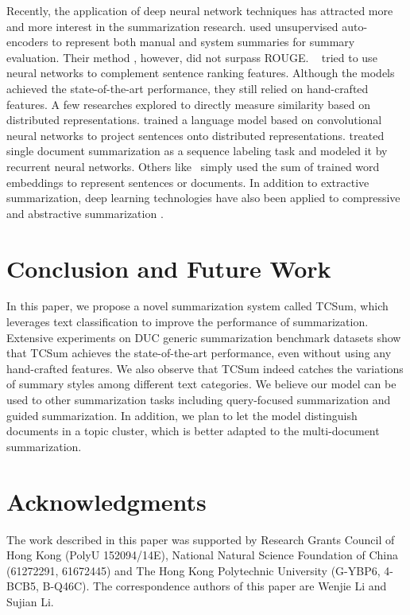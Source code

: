 \documentclass[letterpaper]{article}
\begin{document}
Recently, the application of deep neural network techniques has attracted more and more interest in the summarization research.
\cite{genest2011deep} used unsupervised auto-encoders to represent both manual and system summaries for summary evaluation.
Their method , however, did not surpass ROUGE.
~\cite{cao2015ranking,cao2015learning} tried to use neural networks to complement sentence ranking features.
Although the models achieved the state-of-the-art performance, they still relied on hand-crafted features.
A few researches explored to directly measure similarity based on distributed representations.
\cite{yin2015optimizing} trained a language model based on convolutional neural networks to project sentences onto distributed representations.
\cite{cheng2016neural} treated single document summarization as a sequence labeling task and modeled it by recurrent neural networks.
Others like~\cite{kobayashi-noguchi-yatsuka:2015:EMNLP} simply used the sum of trained word embeddings to represent sentences or documents.
In addition to extractive summarization, deep learning technologies have also been applied to compressive and abstractive summarization \cite{filippova-EtAl:2015:EMNLP,rush-chopra-weston:2015:EMNLP}.

\vspace{-0.89mm}
\section{Conclusion and Future Work}
In this paper, we propose a novel summarization system called TCSum, which leverages text classification to improve the performance of summarization.
Extensive experiments on DUC generic summarization benchmark datasets show that TCSum achieves the state-of-the-art performance, even without using any hand-crafted features.
We also observe that TCSum indeed catches the variations of summary styles among different text categories.
We believe our model can be used to other summarization tasks including query-focused summarization and guided summarization.
In addition, we plan to let the model distinguish documents in a topic cluster, which is better adapted to the multi-document summarization.

\vspace{-0.85mm}
\vspace{-1.54mm}
\section{ Acknowledgments}
The work described in this paper was supported by Research Grants Council of Hong Kong (PolyU 152094/14E), National Natural Science Foundation of China (61272291, 61672445) and The Hong Kong Polytechnic University (G-YBP6, 4-BCB5, B-Q46C).
The correspondence authors of this paper are Wenjie Li and Sujian Li.
\end{document}
